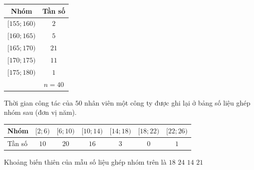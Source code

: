 

\begin{ex}%
		{\begin{tabular}{|c|c|}
		\hline Nhóm  & Tần số \\
		\hline$[155;160)$  & $2$ \\
		{$[160;165)$}& $5$  \\
		{$[165;170)$}& $21$  \\
		{$[170;175)$}& $11$  \\
		{$[175;180)$}&  $1$ \\
		\hline  & $n=40$ \\
		 \hline
\end{tabular}
} 
\end{ex}

\begin{ex}%
	Thời gian công tác của $50$ nhân viên một công ty được ghi lại ở bảng số liệu ghép  nhóm sau (đơn vị năm).
	\begin{center}
		\begin{tabular}{|l|c|c|c|c|c|c|}
			\hline Nhóm &{$[2;6)$}&{$[6;10)$}&{$[10;14)$}&{$[14;18)$}&{$[18;22)$}&{$[22;26)$}\\ 
			\hline Tần số & $10$ & $20$ &  $16$ & $3$ & $0$ & $1$\\
			 \hline
		\end{tabular}
	\end{center}
	 Khoảng biến thiên của mẫu số liệu ghép nhóm trên là
	\choice 
		{$18$} 
		 {\True $24$}
		{$14$} 
		 {$21$}
\end{ex}

